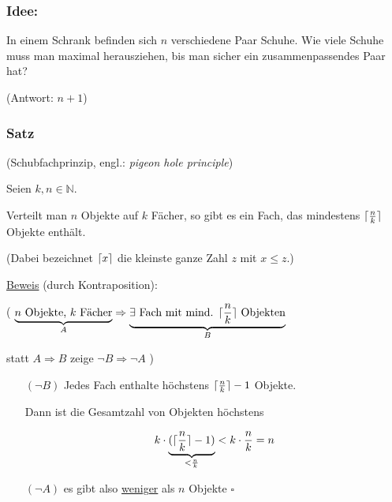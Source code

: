 \documentclass[a4paper, 12pt, twoside] {article}
\DeclarePairedDelimiter\ceil{\lceil}{\rceil}
\begin{document}
\subsubsection{Idee:} In einem Schrank befinden sich $n$ verschiedene Paar Schuhe. Wie viele Schuhe muss man maximal herausziehen, bis man sicher ein zusammenpassendes Paar hat?

(Antwort: $n+1$)

\subsubsection{Satz} (Schubfachprinzip, engl.: {\it pigeon hole principle})

Seien $k,n \in \mathbb{N}$.

Verteilt man $n$ Objekte auf $k$ Fächer, so gibt es ein Fach, das mindestens $\ceil{\frac{n}{k}}$ Objekte enthält.

(Dabei bezeichnet $\ceil{x}$ die kleinste ganze Zahl $z$ mit $x \leq z$.)

\underline{Beweis} (durch Kontraposition):

( $\underbrace{n \text{ Objekte, } k \text{ Fächer}}_{A} \Rightarrow \underbrace{\exists \text{ Fach mit mind. } \ceil{\frac{n}{k}} \text{ Objekten}}_{B}$

statt $A \Rightarrow B$ zeige $\neg B \Rightarrow \neg A$ )

\begin{itemize}
\item[$(\neg B)$]
	Jedes Fach enthalte höchstens $\ceil{\frac{n}{k}}-1$ Objekte.
	
	Dann ist die Gesamtzahl von Objekten höchstens
	
	$$k \cdot \underbrace{(\ceil{\frac{n}{k}}-1)}_{< \frac{n}{k}} < k \cdot \frac{n}{k} = n$$

\item[$(\neg A)$]
	es gibt also \underline{weniger} als $n$ Objekte
	\hfill $\square$

\end{itemize}
\end{document}
